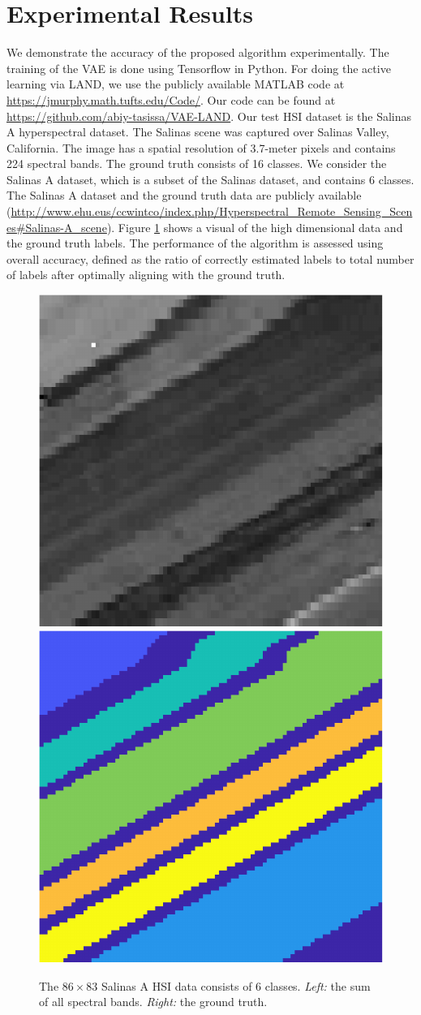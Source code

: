 \documentclass{article}
\begin{document}
\section{Experimental Results}
\label{sec:Experiments}
We demonstrate the accuracy of the proposed algorithm experimentally.  The training of the VAE is done using Tensorflow in Python. For doing the active learning via LAND, we use the publicly available MATLAB code 
at  \url{https://jmurphy.math.tufts.edu/Code/}. Our code can be found at \url{https://github.com/abiy-tasissa/VAE-LAND}. Our test HSI dataset is the Salinas A hyperspectral dataset. The Salinas scene was captured over Salinas Valley, California. The image has a spatial resolution of 3.7-meter pixels and contains 224 spectral bands. The ground truth consists of 16 classes. We consider the Salinas A dataset, which is a subset of the Salinas dataset, and contains 6 classes. The Salinas A dataset and the ground truth data are publicly available (\url{http://www.ehu.eus/ccwintco/index.php/Hyperspectral_Remote_Sensing_Scenes#Salinas-A_scene}). Figure \ref{fig:SalinasA} shows a visual of the high dimensional data and the ground truth labels. The performance of the algorithm is assessed using overall accuracy, defined as the ratio of correctly estimated labels to total number of labels after optimally aligning with the ground truth. 
\begin{figure}[h]
\includegraphics[width=.23\textwidth,clip]{Images/SalinasA_BandSum-crop.pdf}
\includegraphics[width=.23\textwidth,clip]{Images/SalinasA_GT-crop.pdf}
\caption{\small{The $86\times 83$ Salinas A HSI data consists of 6 classes.  \emph{Left:} the sum of all spectral bands.  \emph{Right:} the ground truth.}}
\label{fig:SalinasA}
\end{figure}
\end{document}
